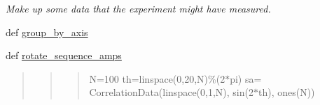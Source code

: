 \begin{DoxyCompactItemize}
\begin{DoxyCompactList}\small\item\em Make up some data that the experiment {\itshape might} have measured. \end{DoxyCompactList}\item 
def \hyperlink{namespacerepo_1_1programs_1_1pythonpackages_1_1pr_1_1SPfuncs_a5a727d85f97fb1e1e7370fbca3b1d1ea}{group\-\_\-by\-\_\-axis}
\item 
def \hyperlink{namespacerepo_1_1programs_1_1pythonpackages_1_1pr_1_1SPfuncs_a792112113be3784fc089059c6eed4ff1}{rotate\-\_\-sequence\-\_\-amps}
\begin{DoxyCompactList}\small\item\em \begin{quotation}
\begin{quotation}
\begin{quotation}
N=100 th=linspace(0,20,\-N)\%(2$\ast$pi) sa= Correlation\-Data(linspace(0,1,\-N), sin(2$\ast$th), ones(\-N)) \end{quotation}


\end{quotation}



\end{quotation}
\end{DoxyCompactList}
\end{DoxyCompactItemize}

